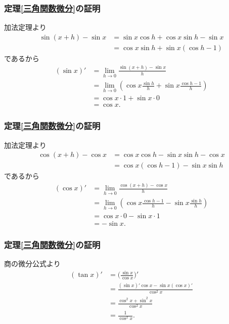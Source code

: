 

\begin{frame}
\frametitle{定理\ref{三角関数微分}の証明}

加法定理より
\begin{align*}
\sin(x +h)-\sin x & = \sin x \cos h + \cos x \sin h -\sin x \\
& =  \cos x \sin h + \sin x( \cos h-1)
\end{align*}
であるから
\begin{align*}
(\sin x)' &= \lim_{h \to 0} \frac{\sin(x +h)-\sin x}{h} \\
& =  \lim_{h \to 0} (\cos x \frac{\sin h}{h} + \sin x \frac{\cos h-1}{h}) \\
& =\cos x \cdot 1 + \sin x \cdot 0 \\
& = \cos x. 
\end{align*}
\end{frame}




\begin{frame}
\frametitle{定理\ref{三角関数微分}の証明}

加法定理より
\begin{align*} 
\cos(x +h)-\cos x & = \cos x \cos h - \sin x \sin h -\cos x \\
& =  \cos x (\cos h-1) - \sin x \sin h
\end{align*}
であるから
\begin{align*}
(\cos x)' &= \lim_{h \to 0} \frac{\cos(x +h)-\cos x}{h} \\
& =  \lim_{h \to 0} (\cos x \frac{\cos h-1}{h} - \sin x \frac{\sin h}{h}) \\
& =\cos x \cdot 0 - \sin x \cdot 1 \\
& = -\sin x. 
\end{align*}
\end{frame}




\begin{frame}
\frametitle{定理\ref{三角関数微分}の証明}

商の微分公式より
\begin{align*} 
(\tan x)' &= \Big( \frac{\sin x}{\cos x} \Big)' \\
&= \frac{(\sin x)'\cos x - \sin x (\cos x)'}{\cos^2 x} \\
&= \frac{\cos^2 x + \sin^2 x}{\cos^2 x} \\
&= \frac{1}{\cos^2 x}. 
\end{align*}

\end{frame}


